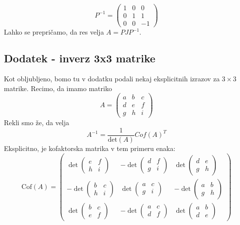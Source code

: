 \documentclass{article}
\begin{document}
\begin{equation*}
P^{-1} = 
\begin{pmatrix}
1 & 0 & 0 \\
0 & 1 & 1 \\
0 & 0 & -1
\end{pmatrix}
\end{equation*}
Lahko se prepričamo, da res velja $A = P J P^{-1}$.

\subsection*{Dodatek - inverz 3x3 matrike}
Kot obljubljeno, bomo tu v dodatku podali nekaj eksplicitnih izrazov za $3 \times 3$ matrike.
Recimo, da imamo matriko
\begin{equation*}
A = \begin{pmatrix} 
a & b & c \\ 
d & e & f \\ 
g & h & i 
\end{pmatrix}
\end{equation*}
Rekli smo že, da velja 
\begin{equation*}
A^{-1} = \frac{1}{\mathrm{det}(A)} Cof(A)^T
\end{equation*}
Eksplicitno, je kofaktorska matrika v tem primeru enaka:
\begin{equation*}
\mathrm{Cof}(A) = \begin{pmatrix}
\det \begin{pmatrix} e & f \\ h & i \end{pmatrix} & -\det \begin{pmatrix} d & f \\ g & i \end{pmatrix} & \det \begin{pmatrix} d & e \\ g & h \end{pmatrix} \\
-\det \begin{pmatrix} b & c \\ h & i \end{pmatrix} & \det \begin{pmatrix} a & c \\ g & i \end{pmatrix} & -\det \begin{pmatrix} a & b \\ g & h \end{pmatrix} \\
\det \begin{pmatrix} b & c \\ e & f \end{pmatrix} & -\det \begin{pmatrix} a & c \\ d & f \end{pmatrix} & \det \begin{pmatrix} a & b \\ d & e \end{pmatrix}
\end{pmatrix}
\end{equation*}
\end{document}
